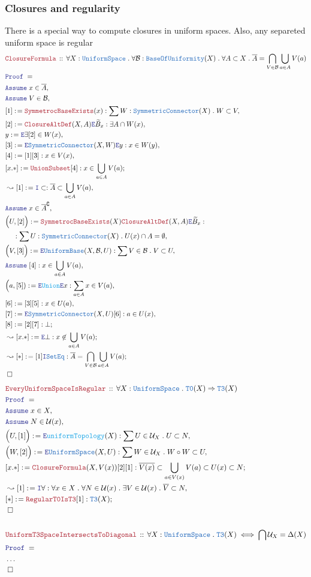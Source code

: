 \documentclass[12pt]{scrartcl}
\newcommand{\TYPE}[1]{\textcolor{NavyBlue}{\mathtt{#1}}}
\newcommand{\FUNC}[1]{\textcolor{Cerulean}{\mathtt{#1}}}
\newcommand{\LOGIC}[1]{\textcolor{Blue}{\mathtt{#1}}}
\newcommand{\THM}[1]{\textcolor{Maroon}{\mathtt{#1}}}
\renewcommand{\.}{\; . \;}
\newcommand{\de}{: \kern 0.1pc =}
\newcommand{\Theorem}[2]{& \THM{#1} \, :: \, #2 \\ & \Proof = \\ }
\newcommand{\NewLine}{\\ & \kern 1pc}
\newcommand{\Page}[1]{ \begin{align*} #1 \end{align*}   }
\newcommand{\NoProof}{ & \ldots \\ \EndProof}
\newcommand{\Imply}{\Rightarrow}
\renewcommand{\c}{\complement}
\newcommand{\Say}[3]{& #1 \de #2 : #3, \\}
\newcommand{\SayIn}[3]{& #1 \de #2 \in #3, \\}
\newcommand{\Conclude}[3]{& #1 \de #2 : #3; \\}
\newcommand{\Derive}[3]{& \leadsto #1 \de #2 : #3, \\}
\newcommand{\DeriveConclude}[3]{& \leadsto #1 \de #2 : #3 ; \\}
\newcommand{\Assume}[2]{& \LOGIC{Assume} \; #1 : #2, \\}
\newcommand{\AssumeIn}[2]{& \LOGIC{Assume} \; #1 \in #2, \\}
\newcommand{\Intro}{\LOGIC{I}}
\newcommand{\Elim}{\LOGIC{E}}
\newcommand{\QED}{\; \square}
\newcommand{\EndProof}{& \QED \\}
\newcommand{\Proof}{\LOGIC{Proof} \; }
\newcommand{\B}{\mathcal{B}}
\renewcommand{\U}{\mathcal{U}}
\newcommand{\US}{\TYPE{UniformSpace}}
\newcommand{\UB}{\TYPE{UniformBase}}
\newcommand{\Sym}{\TYPE{SymmetricConnector}}
\newcommand{\BofU}{\TYPE{BaseOfUniformity}}
\begin{document}
\subsubsection{Closures and regularity}
There is a special way to compute closures in uniform spaces.
Also, any separeted uniform space is regular
\Page{
	\Theorem{ClosureFormula}
	{
		\forall X  : \US \.
		\forall \B : \BofU(X) \.
		\forall A \subset X \.
		\overline{A} = \bigcap_{V \in \B} \bigcup_{a \in A} V(a)
	}
	\AssumeIn{x}{\overline{A}}
	\AssumeIn{V}{\B}
	\Say{[1]}{\THM{SymmetrocBaseExists}(x)}
	{
		\sum W : \Sym(X) \. W \subset V
	}
	\Say{[2]}{\THM{ClosureAltDef}(X,A)\Elim \widetilde{B}_x}{\exists A \cap W(x)}
	\SayIn{y}{\Elim \exists [2]}{W(x)}
	\Say{[3]}{\Elim \Sym(X,W) \Elim y}{x \in W(y)}
	\Say{[4]}{[1][3]}
	{
		x \in V(x)	
	}
	\Conclude{[x.*]}{\THM{UnionSubset}[4]}
	{
		x \in \bigcup_{a \in A} V(a)
	}
	\Derive{[1]}{\Intro \subset}
	{
			\overline{A} \subset \bigcup_{a \in A} V(a)
	}
	\AssumeIn{x}{{\overline{A}}^\c}
	\Say{\Big(U,[2]\Big)}
	{
			\THM{SymmetrocBaseExists}(X)
			\THM{ClosureAltDef}(X,A)\Elim \widetilde{B}_x
	}
	{
		\NewLine :	    
	    \sum U  : \Sym(X) \.  
		U(x) \cap A = \emptyset
	}
	\Say{\Big(V,[3]\Big)}
	{
		\Elim \UB(X,\B,U)
	}
	{
		\sum V \in \B \. V \subset U
	}
	\Assume{[4]}{x \in \bigcup_{a \in A} V(a)}
	\Say{\Big(a,[5])}{\Elim \FUNC{Union}\Elim x}
	{
		\sum_{a \in A} x \in V(a)  
	}
	\Say{[6]}{[3][5]}{x \in U(a)}
	\Say{[7]}{\Elim \Sym(X,U)[6]}{a \in U(x)}
	\Conclude{[8]}{[2][7]}
	{
		\bot	
	}
	\DeriveConclude{[x.*]}{\Elim \bot}{x \not \in \bigcup_{a \in A} V(a)}
	\DeriveConclude{[*]}{[1]\Intro \TYPE{SetEq}}
	{
		\overline{A} = \bigcap_{V \in \B} \bigcup_{a \in A} V(a)
	}
	\EndProof
}\Page{
	\Theorem{EveryUniformSpaceIsRegular}
	{
		\forall X : \US \.
		\TYPE{T0}(X) \Imply \TYPE{T3}(X)
	}
	\AssumeIn{x}{X}
	\AssumeIn{N}{\U(x)}
	\Say{\Big(U,[1]\Big)}
	{
		\Elim \FUNC{uniformTopology}(X)
	}
	{
		\sum U \in \U_X \. U \subset N 
	}
	\Say{\Big(W,[2]\Big)}
	{
		\Elim \US(X,U)
	}
	{
		\sum W \in \U_X \. W \circ W \subset U 
	}
	\Conclude{[x.*]}{\THM{ClosureFormula}(X,V(x))[2][1]}
	{
		\overline{V(x)} \subset \bigcup_{a \in V(x)} V(a)
		\subset  U(x) \subset  N
	}
	\Derive{[1]}{\Intro \forall}
	{
		\forall x \in X \.
		\forall N \in \U(x) \.
		\exists V \in \U(x) \.
		\overline{V} \subset N
	}
	\Conclude{[*]}
	{
		\THM{RegularT0IsT3}[1]
	}
	{
		\TYPE{T3}(X)
	}
	\EndProof
	\\
	\Theorem{UniformT3SpaceIntersectsToDiagonal}
	{
		\forall X : \US \.
		\TYPE{T3}(X) \iff
		\bigcap \U_X = \Delta(X) 
	}
	\NoProof
	\\
}
\end{document}
